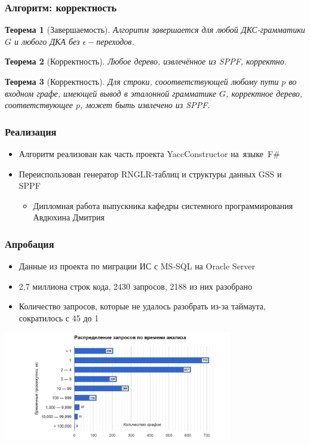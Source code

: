 \documentclass{beamer}
\newtheorem{rutheorem}{Теорема}
\begin{document}
\begin{frame}
  \transwipe[direction=90]
  \frametitle{Алгоритм: корректность}
  \begin{rutheorem}[Завершаемость]
    Алгоритм завершается для любой ДКС-грамматики $G$ и любого ДКА без $\epsilon-$переходов.
  \end{rutheorem}
  
  \begin{rutheorem}[Корректность]
    Любое дерево, извлечённое из SPPF, корректно.
  \end{rutheorem}

  \begin{rutheorem}[Корректность]
    Для строки, сооответствующей любому пути $p$ во входном графе, имеющей вывод в эталонной грамматике $G$, корректное дерево, соответствующее $p$, может быть извлечено из SPPF.
  \end{rutheorem}
\end{frame}

\begin{frame}
  \transwipe[direction=90]
  \frametitle{Реализация}
  \begin{itemize}
    \item Алгоритм реализован как часть проекта YaccConstructor на~языке~F\#
    \item Переиспользован генератор RNGLR-таблиц и структуры данных GSS и SPPF
    \begin{itemize}
      \item Дипломная работа выпускника кафедры системного программирования 
Авдюхина Дмитрия
    \end{itemize}
  \end{itemize}
\end{frame}

\begin{frame}[t]
  \transwipe[direction=90]
  \frametitle{Апробация}
  \begin{itemize}
    \item Данные из проекта по миграции ИС с MS-SQL на Oracle Server
    \item 2,7 миллиона строк кода, 2430 запросов, 2188 из них разобрано
    \item Количество запросов, которые не удалось разобрать из-за таймаута, 
сократилось с 45 до 1
  \end{itemize}
  \includegraphics[width=10cm]{pictures/dist.png}
\end{frame}
\end{document}
